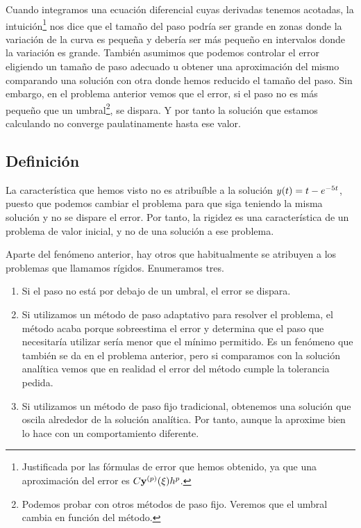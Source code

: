 Cuando integramos una ecuación diferencial cuyas derivadas tenemos acotadas,
la intuición\footnote{
    Justificada por las fórmulas de error que hemos obtenido,
    ya que una aproximación del error es $C\vb{y}{}^{(p)}(\xi)h^p$.
}
nos dice que el tamaño del paso
podría ser grande en zonas donde la variación de la curva es pequeña
y debería ser más pequeño en intervalos donde la variación es grande.
También asumimos que podemos controlar el error
eligiendo un tamaño de paso adecuado u
obtener una aproximación del mismo
comparando una solución con otra donde hemos reducido el tamaño del paso.
Sin embargo, en el problema anterior vemos que el error,
si el paso no es más pequeño que un umbral\footnote{
    Podemos probar con otros métodos de paso fijo.
    Veremos que el umbral cambia en función del método.
},
se dispara.
Y por tanto la solución que estamos calculando
no converge paulatinamente hasta ese valor.

\subsection{Definición}

La característica que hemos visto no es atribuíble a la solución
$y(t) = t - e^{-5t}$,
puesto que podemos cambiar el problema para que siga teniendo la misma solución
y no se dispare el error.
Por tanto, la rigidez es una característica de un problema de valor inicial,
y no de una solución a ese problema.

Aparte del fenómeno anterior,
hay otros que habitualmente se atribuyen a los problemas que llamamos rígidos.
Enumeramos tres.
\begin{enumerate}
    \item Si el paso no está por debajo de un umbral,
    el error se dispara.
    \item Si utilizamos un método de paso adaptativo para resolver el problema,
    el método acaba porque sobreestima el error y determina que
    el paso que necesitaría utilizar sería menor que el mínimo permitido.
    Es un fenómeno que también se da en el problema anterior,
    pero si comparamos con la solución analítica vemos que en realidad
    el error del método cumple la tolerancia pedida.
    \item Si utilizamos un método de paso fijo tradicional,
    obtenemos una solución que oscila alrededor de la solución analítica.
    Por tanto, aunque la aproxime bien lo hace con un comportamiento diferente.
\end{enumerate}

